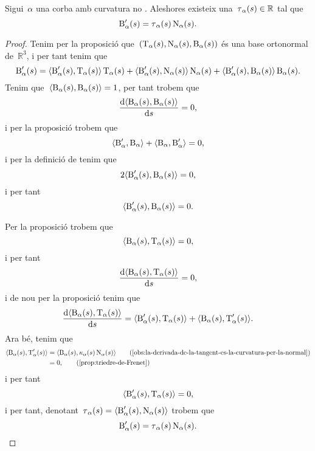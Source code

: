 \documentclass[../geometria-diferencial.tex]{subfiles}
\begin{document}
    \begin{proposition}
        \label{prop:torsio}
        Sigui~\(\alpha\) una corba amb curvatura no \nulla{}.
        Aleshores existeix una~\(\operatorname{\tau}_{\alpha}(s)\in\mathbb{R}\) tal que
        \[
            \operatorname{B}'_{\alpha}(s)=\operatorname{\tau}_{\alpha}(s)\operatorname{N}_{\alpha}(s).
        \]
    \end{proposition}
    \begin{proof}
        Tenim per la proposició  que~\((\operatorname{T}_{\alpha}(s),\operatorname{N}_{\alpha}(s),\operatorname{B}_{\alpha}(s))\) és una base ortonormal de~\(\mathbb{R}^{3}\), i per tant tenim que %
        \[
            \binormal'_{\alpha}(s)=\prodesc{\binormal'_{\alpha}(s)}{\tangent_{\alpha}(s)}\tangent_{\alpha}(s)+\prodesc{\binormal'_{\alpha}(s)}{\normal_{\alpha}(s)}\normal_{\alpha}(s)+\prodesc{\binormal'_{\alpha}(s)}{\binormal_{\alpha}(s)}\binormal_{\alpha}(s).
        \]
        Tenim que~\(\prodesc{\binormal_{\alpha}(s)}{\binormal_{\alpha}(s)}=1\), per tant trobem que
        \[
            \frac{\diff\prodesc{\binormal_{\alpha}(s)}{\binormal_{\alpha}(s)}}{\diff s}=0,
        \]
        i per la proposició  trobem que
        \[
            \prodesc{\binormal'_{\alpha}}{\binormal_{\alpha}}+\prodesc{\binormal_{\alpha}}{\binormal'_{\alpha}}=0,
        \]
        i per la definició de  tenim que
        \[
            2\prodesc{\binormal'_{\alpha}(s)}{\binormal_{\alpha}(s)}=0,
        \]
        i per tant
        \[
            \prodesc{\binormal'_{\alpha}(s)}{\binormal_{\alpha}(s)}=0.
        \]

        Per la proposició  trobem que
        \[
            \prodesc{\binormal_{\alpha}(s)}{\tangent_{\alpha}(s)}=0,
        \]
        i per tant
        \[
            \frac{\diff\prodesc{\binormal_{\alpha}(s)}{\tangent_{\alpha}(s)}}{\diff s}=0,
        \]
        i de nou per la proposició  tenim que
        \[
            \frac{\diff\prodesc{\binormal_{\alpha}(s)}{\tangent_{\alpha}(s)}}{\diff s}=\prodesc{\binormal'_{\alpha}(s)}{\tangent_{\alpha}(s)}+\prodesc{\binormal_{\alpha}(s)}{\tangent'_{\alpha}(s)}.
        \]
        Ara bé, tenim que
        \begin{align*}
            \prodesc{\binormal_{\alpha}(s)}{\tangent'_{\alpha}(s)}&=\prodesc{\binormal_{\alpha}(s)}{\curvatura_{\alpha}(s)\normal_{\alpha}(s)} \tag{\ref{obs:la-derivada-de-la-tangent-es-la-curvatura-per-la-normal}} \\
            &=0, \tag{\ref{prop:triedre-de-Frenet}}
        \end{align*}
        i per tant
        \[
            \prodesc{\binormal'_{\alpha}(s)}{\tangent_{\alpha}(s)}=0,
        \]
        i per tant, denotant~\(\torsio_{\alpha}(s)=\prodesc{\binormal'_{\alpha}(s)}{\normal_{\alpha}(s)}\) trobem que
        \[
            \operatorname{B}'_{\alpha}(s)=\operatorname{\tau}_{\alpha}(s)\operatorname{N}_{\alpha}(s).\qedhere
        \]
    \end{proof}
\end{document}
